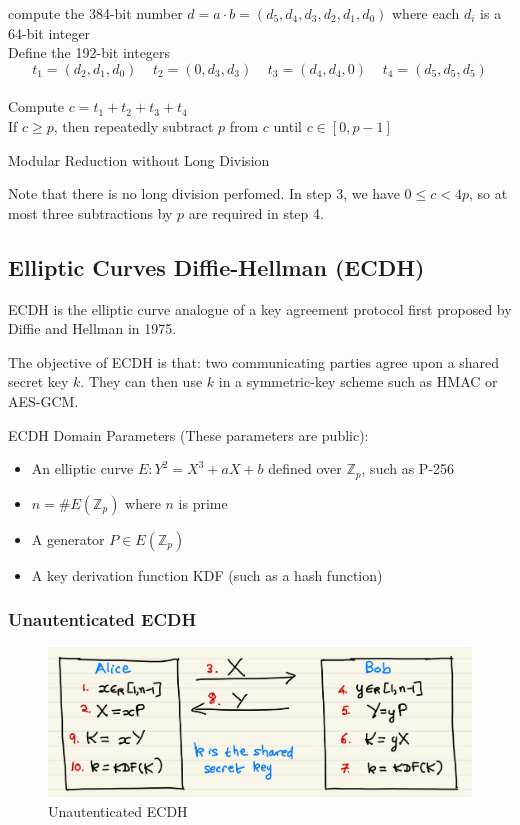 \documentclass[12pt,titlepage]{article}
\begin{document}
\begin{algorithm}
	compute the 384-bit number $d = a \cdot b = (d_5, d_4, d_3, d_2, d_1, d_0)$ where each $d_i$ is a 64-bit integer\\
	Define the 192-bit integers $$t_1 = (d_2, d_1, d_0) \;\;\;\; t_2 = (0, d_3, d_3) \;\;\;\; t_3 = (d_4, d_4, 0) \;\;\;\; t_4 = (d_5, d_5, d_5)$$\\
	Compute $c = t_1 + t_2 + t_3 + t_4$\\
	If $c \geq p$, then repeatedly subtract $p$ from $c$ until $c \in [0, p-1]$\\
	\caption{Modular Reduction without Long Division}
\end{algorithm}
Note that there is no long division perfomed. In step 3, we have $0 \leq c < 4p$, so at most three subtractions by $p$ are required in step 4. 
\subsection{Elliptic Curves Diffie-Hellman (ECDH)}
ECDH is the elliptic curve analogue of a key agreement protocol first proposed by Diffie and Hellman in 1975. 

The objective of ECDH is that: two communicating parties agree upon a shared secret key $k$. They can then use $k$ in a symmetric-key scheme such as HMAC or AES-GCM. 

ECDH Domain Parameters (These parameters are public):\begin{itemize}
	\item An elliptic curve $E: Y^2 = X^3 + aX +b$ defined over $\mathbb{Z}_p$, such as P-256
	\item $n = \#E(\mathbb{Z}_p)$ where $n$ is prime
	\item A generator $P \in E(\mathbb{Z}_p)$
	\item A key derivation function KDF (such as a hash function)
\end{itemize}

\subsubsection{Unautenticated ECDH}
\begin{center}
	\begin{figure}[h!]
		\centering
		\includegraphics[width=.8\textwidth]{Unautenticated_ECDH.png}
		\caption{Unautenticated ECDH}
	\end{figure}
\end{center}
\end{document}
